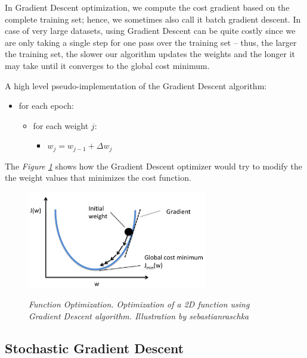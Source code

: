 In Gradient Descent optimization, we compute the cost gradient based on the
complete training set; hence, we sometimes also call it batch gradient descent.
In case of very large datasets, using Gradient Descent can be quite costly
since we are only taking a single step for one pass over the training set –
thus, the larger the training set, the slower our algorithm updates the weights
and the longer it may take until it converges to the global cost minimum.
\newline

A high level pseudo-implementation of the Gradient Descent algorithm:

\begin{itemize}[label=\(\circ\)]
  \item for each epoch:
    \begin{itemize}[label=\(\circ\), topsep=0pt]
      \item for each weight \(j\):
        \begin{itemize}[label=\(\circ\), topsep=5pt]
          \item \(w_j = w_{j-1} + \Delta w_j\)
        \end{itemize}
    \end{itemize}
\end{itemize}

The \textit{Figure \ref{fig:optimization}} shows how the Gradient Descent
optimizer would try to modify the  the weight values that minimizes the cost
function.

\begin{figure}[H]
  \centering
  \includegraphics[width=0.7\textwidth]{imatges/preliminaries/optimization.png}
  \caption[Function Optimization]{\textit{Function Optimization. Optimization of a 2D function using Gradient Descent algorithm. Illustration by sebastianraschka}}
  {\label{fig:optimization}}
\end{figure}

\newpage

\subsection{Stochastic Gradient Descent}

